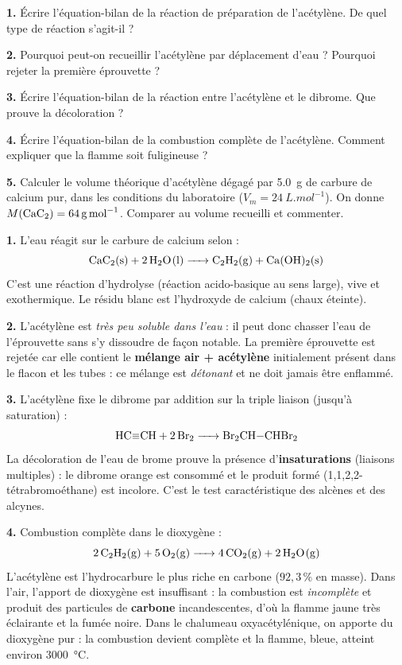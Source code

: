 \documentclass[11pt]{article}
\newcommand{\cle}[1]{{\popxbold\color{popdark}#1}}
\begin{document}
\begin{exoresolu}
\textbf{1.} Écrire l'équation-bilan de la réaction de préparation de l'acétylène. De quel type de réaction s'agit-il ?

\textbf{2.} Pourquoi peut-on recueillir l'acétylène par déplacement d'eau ? Pourquoi rejeter la première éprouvette ?

\textbf{3.} Écrire l'équation-bilan de la réaction entre l'acétylène et le dibrome. Que prouve la décoloration ?

\textbf{4.} Écrire l'équation-bilan de la combustion complète de l'acétylène. Comment expliquer que la flamme soit fuligineuse ?

\textbf{5.} Calculer le volume théorique d'acétylène dégagé par \SI{5,0}{g} de carbure de calcium pur, dans les conditions du laboratoire ($V_m = \SI{24}{L.mol^{-1}}$). On donne $M(\ce{CaC2}) = \SI{64}{g.mol^{-1}}$. Comparer au volume recueilli et commenter.

\tcblower
\textbf{1.} L'eau réagit sur le carbure de calcium selon :
\[ \ce{CaC2(s) + 2 H2O(l) -> C2H2(g) + Ca(OH)2(s)} \]
C'est une réaction d'\cle{hydrolyse} (réaction acido-basique au sens large), vive et exothermique. Le résidu blanc est l'hydroxyde de calcium (chaux éteinte).

\textbf{2.} L'acétylène est \emph{très peu soluble dans l'eau} : il peut donc chasser l'eau de l'éprouvette sans s'y dissoudre de façon notable. La première éprouvette est rejetée car elle contient le \textbf{mélange air + acétylène} initialement présent dans le flacon et les tubes : ce mélange est \emph{détonant} et ne doit jamais être enflammé.

\textbf{3.} L'acétylène fixe le dibrome par \cle{addition} sur la triple liaison (jusqu'à saturation) :
\[ \ce{HC#CH + 2 Br2 -> Br2CH-CHBr2} \]
La décoloration de l'eau de brome prouve la présence d'\textbf{insaturations} (liaisons multiples) : le dibrome orange est consommé et le produit formé (1,1,2,2-tétrabromoéthane) est incolore. C'est le test caractéristique des alcènes et des alcynes.

\textbf{4.} Combustion complète dans le dioxygène :
\[ \ce{2 C2H2(g) + 5 O2(g) -> 4 CO2(g) + 2 H2O(g)} \]
L'acétylène est l'hydrocarbure le plus riche en carbone ($92,3\,\%$ en masse). Dans l'air, l'apport de dioxygène est insuffisant : la combustion est \emph{incomplète} et produit des particules de \textbf{carbone} incandescentes, d'où la flamme jaune très éclairante et la fumée noire. Dans le chalumeau oxyacétylénique, on apporte du dioxygène pur : la combustion devient complète et la flamme, bleue, atteint environ \SI{3000}{\celsius}.


\end{exoresolu}
\end{document}

